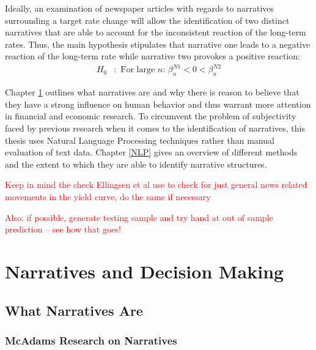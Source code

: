 \documentclass[11pt,a4paper,english,oneside]{book}
\numberwithin{equation}{chapter}
\begin{document}
Ideally, an examination of newspaper articles with regards to narratives surrounding a target rate change will allow the identification of two distinct narratives that are able to account for the inconsistent reaction of the long-term rates. Thus, the main hypothesis stipulates that narrative one leads to a negative reaction of the long-term rate while narrative two provokes a positive reaction:
\begin{align}\label{H00}
H_0&:  \text{ For large $n$: } \beta_n^{N1}<0< \beta_n^{N2}
\end{align}

Chapter \ref{NarrativesAndDecisionMaking} outlines what narratives are and why there is reason to believe that they have a strong influence on human behavior and thus warrant more attention in financial and economic research. To circumvent the problem of subjectivity faced by previous research when it comes to the identification of narratives, this thesis uses Natural Language Processing techniques rather than manual evaluation of text data. Chapter \ref{NLP} gives an overview of different methods and the extent to which they are able to identify narrative structures. 

\textcolor{red}{Keep in mind the check Ellingsen et al use to check for just general news related movements in the yield curve, do the same if necessary}

\textcolor{red}{Also: if possible, generate testing sample and try hand at out of sample prediction -- see how that goes!}


\chapter{Narratives and Decision Making}\label{NarrativesAndDecisionMaking}


\section{What Narratives Are}

\subsection{McAdams Research on Narratives}
\end{document}
